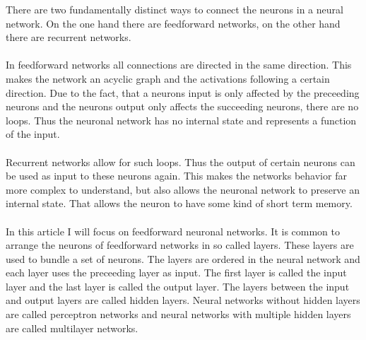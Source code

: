 There are two fundamentally distinct ways to connect the neurons in a neural network. On the one hand there are feedforward networks, on the other hand there are recurrent networks.
\\
\\
In feedforward networks all connections are directed in the same direction. This makes the network an acyclic graph and the activations following a certain direction. Due to the fact, that a neurons input is only affected by the preceeding neurons and the neurons output only affects the succeeding neurons, there are no loops. Thus the neuronal network has no internal state and represents a function of the input. 
\\
\\
Recurrent networks allow for such loops. Thus the output of certain neurons can be used as input to these neurons again. This makes the networks behavior far more complex to understand, but also allows the neuronal network to preserve an internal state. That allows the neuron to have some kind of short term memory.
\\
\\
In this article I will focus on feedforward neuronal networks. It is common to arrange the neurons of feedforward networks in so called layers. These layers are used to bundle a set of neurons. The layers are ordered in the neural network and each layer uses the preceeding layer as input. The first layer is called the input layer and the last layer is called the output layer. The layers between the input and output layers are called hidden layers. Neural networks without hidden layers are called perceptron networks and neural networks with multiple hidden layers are called multilayer networks. 
\\
